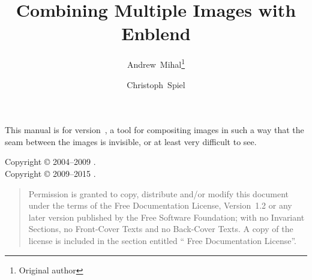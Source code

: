 

\begin{titlepage}
  \renewcommand{\thefootnote}{\fnsymbol{footnote}}

  \author{Andrew~Mihal\footnote{Original author} \and Christoph~Spiel}

  \title{Combining Multiple Images with Enblend }

  \date{}

  \maketitle
\end{titlepage}


\vspace*{\fill}
\ifhevea\relax\else \begin{center}\end{center}\fi
\label{sec:abstract}\noindent This manual is for \App{}
version~, a tool for compositing images in such a way
that the seam between the images is invisible, or at least very
difficult to see.

\vspace*{\fill}

\begin{flushleft}
  Copyright \copyright{} 2004--2009 . \\
  Copyright \copyright{} 2009--2015 .
\end{flushleft}

\begin{quotation}
  \noindent Permission is granted to copy, distribute and/or modify
  this document under the terms of the  Free
  Documentation License, Version~1.2 or any later version published by
  the Free Software Foundation; with no Invariant Sections, no
  Front-Cover Texts and no Back-Cover Texts.  A copy of the license is
  included in the section entitled `` Free Documentation
  License''.
\end{quotation}

\cleardoublepage{}
